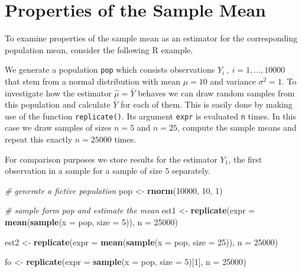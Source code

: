 \documentclass[]{book}
\newenvironment{Shaded}{\begin{snugshade}}{\end{snugshade}}
\newcommand{\KeywordTok}[1]{\textcolor[rgb]{0.13,0.29,0.53}{\textbf{#1}}}
\newcommand{\DataTypeTok}[1]{\textcolor[rgb]{0.13,0.29,0.53}{#1}}
\newcommand{\DecValTok}[1]{\textcolor[rgb]{0.00,0.00,0.81}{#1}}
\newcommand{\StringTok}[1]{\textcolor[rgb]{0.31,0.60,0.02}{#1}}
\newcommand{\CommentTok}[1]{\textcolor[rgb]{0.56,0.35,0.01}{\textit{#1}}}
\newcommand{\NormalTok}[1]{#1}
\theoremstyle{definition}
\theoremstyle{definition}
\theoremstyle{definition}
\theoremstyle{remark}
\begin{document}
\section{Properties of the Sample
Mean}\label{properties-of-the-sample-mean}

To examine properties of the sample mean as an estimator for the
corresponding population mean, consider the following R example.

We generate a population \texttt{pop} which consists observations
\(Y_i \ , \ i=1,\dots,10000\) that stem from a normal distribution with
mean \(\mu = 10\) and variance \(\sigma^2 = 1\). To investigate how the
estimator \(\hat{\mu} = \bar{Y}\) behaves we can draw random samples
from this population and calculate \(\bar{Y}\) for each of them. This is
easily done by making use of the function \texttt{replicate()}. Its
argument \texttt{expr} is evaluated \texttt{n} times. In this case we
draw samples of sizes \(n=5\) and \(n=25\), compute the sample means and
repeat this exactly \(n=25000\) times.

For comparison purposes we store results for the estimator \(Y_1\), the
first observation in a sample for a sample of size \(5\) separately.

\begin{Shaded}
\begin{Highlighting}[]
\CommentTok{# generate a fictive population}
\NormalTok{pop <-}\StringTok{ }\KeywordTok{rnorm}\NormalTok{(}\DecValTok{10000}\NormalTok{, }\DecValTok{10}\NormalTok{, }\DecValTok{1}\NormalTok{)}

\CommentTok{# sample form pop and estimate the mean}
\NormalTok{est1 <-}\StringTok{ }\KeywordTok{replicate}\NormalTok{(}\DataTypeTok{expr =} \KeywordTok{mean}\NormalTok{(}\KeywordTok{sample}\NormalTok{(}\DataTypeTok{x =}\NormalTok{ pop, }\DataTypeTok{size =} \DecValTok{5}\NormalTok{)), }\DataTypeTok{n =} \DecValTok{25000}\NormalTok{)}

\NormalTok{est2 <-}\StringTok{ }\KeywordTok{replicate}\NormalTok{(}\DataTypeTok{expr =} \KeywordTok{mean}\NormalTok{(}\KeywordTok{sample}\NormalTok{(}\DataTypeTok{x =}\NormalTok{ pop, }\DataTypeTok{size =} \DecValTok{25}\NormalTok{)), }\DataTypeTok{n =} \DecValTok{25000}\NormalTok{)}

\NormalTok{fo <-}\StringTok{ }\KeywordTok{replicate}\NormalTok{(}\DataTypeTok{expr =} \KeywordTok{sample}\NormalTok{(}\DataTypeTok{x =}\NormalTok{ pop, }\DataTypeTok{size =} \DecValTok{5}\NormalTok{)[}\DecValTok{1}\NormalTok{], }\DataTypeTok{n =} \DecValTok{25000}\NormalTok{)}
\end{Highlighting}
\end{Shaded}
\end{document}
